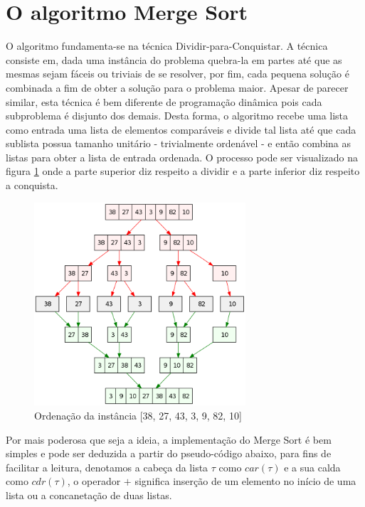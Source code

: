 \documentclass[12pt]{article}
\begin{document}
\subsection{}

\section{O algoritmo Merge Sort}
\label{merge_sort}

O algoritmo fundamenta-se na técnica Dividir-para-Conquistar. A técnica consiste em, dada uma instância do problema
quebra-la em partes até que as mesmas sejam fáceis ou triviais de se resolver, por fim, cada pequena solução é combinada a fim
de obter a solução para o problema maior. Apesar de parecer similar, esta técnica é bem diferente de programação dinâmica pois
cada subproblema é disjunto dos demais. Desta forma, o algoritmo recebe uma lista como entrada uma lista de elementos comparáveis
e divide tal lista até que cada sublista possua tamanho unitário - trivialmente ordenável - e então combina as listas para obter
a lista de entrada ordenada. O processo pode ser visualizado na figura \ref{fig:merge_sort_example} onde a parte superior diz respeito
a dividir e a parte inferior diz respeito a conquista.

\begin{figure}[h]
        \centering
        \includegraphics[width=0.7\textwidth]{figures/merge.png}
        \caption{Ordenação da instância [38, 27, 43, 3, 9, 82, 10]}
        \label{fig:merge_sort_example}
\end{figure}

Por mais poderosa que seja a ideia, a implementação do Merge Sort é bem simples e pode ser deduzida a partir do pseudo-código abaixo, 
para fins de facilitar a leitura, denotamos a cabeça da lista $\tau$ como $car(\tau)$ e a sua calda como $cdr(\tau)$, o operador $+$
significa inserção de um elemento no início de uma lista ou a concanetação de duas listas. 
\end{document}
